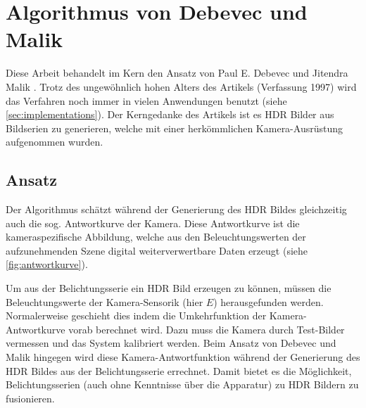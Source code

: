 \chapter{Algorithmus von Debevec und Malik \cite{paper}}
\label{chap:algo}
Diese Arbeit behandelt im Kern den Ansatz von Paul E. Debevec und Jitendra Malik \cite{paper}. Trotz des ungewöhnlich hohen Alters des Artikels (Verfassung 1997) wird das Verfahren noch immer in vielen Anwendungen benutzt (siehe \autoref{sec:implementations}). Der Kerngedanke des Artikels ist es \gls{HDR} Bilder aus Bildserien zu generieren, welche mit einer herkömmlichen Kamera-Ausrüstung aufgenommen wurden.

\section{Ansatz}
Der Algorithmus schätzt während der Generierung des \gls{HDR} Bildes gleichzeitig auch die sog. Antwortkurve der Kamera. Diese Antwortkurve ist die kameraspezifische Abbildung, welche aus den Beleuchtungswerten der aufzunehmenden Szene digital weiterverwertbare Daten erzeugt (siehe \autoref{fig:antwortkurve}). 

Um aus der Belichtungsserie ein \gls{HDR} Bild erzeugen zu können, müssen die Beleuchtungswerte der Kamera-Sensorik (hier $E$) herausgefunden werden. Normalerweise geschieht dies indem die Umkehrfunktion der Kamera-Antwortkurve vorab berechnet wird. Dazu muss die Kamera durch Test-Bilder vermessen und das System kalibriert werden. Beim Ansatz von Debevec und Malik hingegen wird diese Kamera-Antwortfunktion während der Generierung des \gls{HDR} Bildes aus der Belichtungsserie errechnet. Damit bietet es die Möglichkeit, Belichtungsserien (auch ohne Kenntnisse über die Apparatur) zu \gls{HDR} Bildern zu fusionieren.


